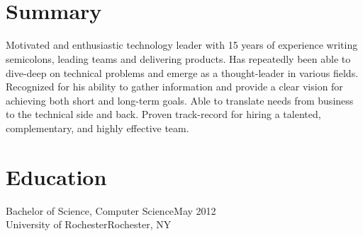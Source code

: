 \documentclass[oneside, final]{scrartcl}
\begin{document}
\begin{center}
 
\textsc{\LARGE{}}\\
\\

\section{Summary}
\begin{flushleft}
Motivated and enthusiastic technology leader with 15 years of experience writing semicolons, leading teams and delivering products. Has repeatedly been able to dive-deep on technical problems and emerge as a thought-leader in various fields. Recognized for his ability to gather information and provide a clear vision for achieving both short and long-term goals. Able to translate needs from business to the technical side and back. Proven track-record for hiring a talented, complementary, and highly effective team.
\end{flushleft}


\section{Education}
Bachelor of Science, Computer Science\hfill May 2012\\
University of Rochester\hfill Rochester, NY\\


\end{center}
\end{document}
